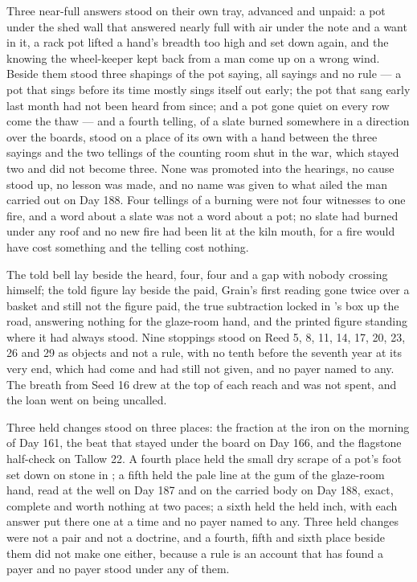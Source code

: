 Three near-full answers stood on their own tray, advanced and unpaid: a pot under the shed wall that answered nearly full with air under the note and a want in it, a rack pot lifted a hand's breadth too high and set down again, and the knowing the wheel-keeper kept back from a man come up on a wrong wind. Beside them stood three shapings of the pot saying, all sayings and no rule --- a pot that sings before its time mostly sings itself out early; the pot that sang early last month had not been heard from since; and a pot gone quiet on every row come the thaw --- and a fourth telling, of a slate burned somewhere in a direction over the boards, stood on a place of its own with a hand between the three sayings and the two tellings of the counting room shut in the war, which stayed two and did not become three. None was promoted into the hearings, no cause stood up, no lesson was made, and no name was given to what ailed the man carried out on Day 188. Four tellings of a burning were not four witnesses to one fire, and a word about a slate was not a word about a pot; no slate had burned under any roof and no new fire had been lit at the kiln mouth, for a fire would have cost something and the telling cost nothing.

The told bell lay beside the heard, four, four and a gap with nobody crossing himself; the told figure lay beside the paid, Grain's first reading gone twice over a basket and still not the figure paid, the true subtraction locked in 's box up the road, answering nothing for the glaze-room hand, and the printed figure standing where it had always stood. Nine stoppings stood on Reed 5, 8, 11, 14, 17, 20, 23, 26 and 29 as objects and not a rule, with no tenth before the seventh year at its very end, which had come and had still not given, and no payer named to any. The breath from Seed 16 drew at the top of each reach and was not spent, and the loan went on being uncalled.

Three held changes stood on three places: the fraction at the iron on the morning of Day 161, the beat that stayed under the board on Day 166, and the flagstone half-check on Tallow 22. A fourth place held the small dry scrape of a pot's foot set down on stone in ; a fifth held the pale line at the gum of the glaze-room hand, read at the well on Day 187 and on the carried body on Day 188, exact, complete and worth nothing at two paces; a sixth held the held inch, with each answer put there one at a time and no payer named to any. Three held changes were not a pair and not a doctrine, and a fourth, fifth and sixth place beside them did not make one either, because a rule is an account that has found a payer and no payer stood under any of them.

